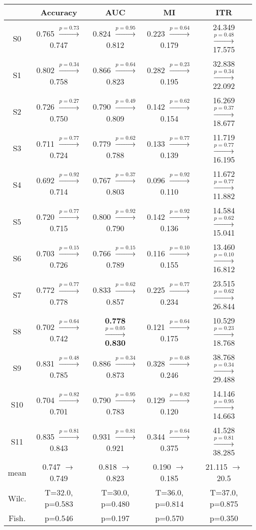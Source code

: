 \begin{tabular}{c c c c c}
\toprule
 & Accuracy & AUC & MI & ITR\\
\midrule
S0 &  0.765 $\xrightarrow{p=0.73}$  0.747 &  0.824 $\xrightarrow{p=0.95}$  0.812 &  0.223 $\xrightarrow{p=0.64}$  0.179 & 24.349 $\xrightarrow{p=0.48}$ 17.575\\
S1 &  0.802 $\xrightarrow{p=0.34}$  0.758 &  0.866 $\xrightarrow{p=0.64}$  0.823 &  0.282 $\xrightarrow{p=0.23}$  0.195 & 32.838 $\xrightarrow{p=0.34}$ 22.092\\
S2 &  0.726 $\xrightarrow{p=0.27}$  0.750 &  0.790 $\xrightarrow{p=0.49}$  0.809 &  0.142 $\xrightarrow{p=0.62}$  0.154 & 16.269 $\xrightarrow{p=0.37}$ 18.677\\
S3 &  0.711 $\xrightarrow{p=0.77}$  0.724 &  0.779 $\xrightarrow{p=0.62}$  0.788 &  0.133 $\xrightarrow{p=0.77}$  0.139 & 11.719 $\xrightarrow{p=0.77}$ 16.195\\
S4 &  0.692 $\xrightarrow{p=0.92}$  0.714 &  0.767 $\xrightarrow{p=0.37}$  0.803 &  0.096 $\xrightarrow{p=0.92}$  0.110 & 11.672 $\xrightarrow{p=0.77}$ 11.882\\
S5 &  0.720 $\xrightarrow{p=0.77}$  0.715 &  0.800 $\xrightarrow{p=0.92}$  0.790 &  0.142 $\xrightarrow{p=0.92}$  0.136 & 14.584 $\xrightarrow{p=0.62}$ 15.041\\
S6 &  0.703 $\xrightarrow{p=0.15}$  0.726 &  0.766 $\xrightarrow{p=0.15}$  0.789 &  0.116 $\xrightarrow{p=0.10}$  0.155 & 13.460 $\xrightarrow{p=0.10}$ 16.812\\
S7 &  0.772 $\xrightarrow{p=0.77}$  0.778 &  0.833 $\xrightarrow{p=0.62}$  0.857 &  0.225 $\xrightarrow{p=0.77}$  0.234 & 23.515 $\xrightarrow{p=0.62}$ 26.844\\
S8 &  0.702 $\xrightarrow{p=0.64}$  0.742 & \textbf{ 0.778 $\xrightarrow{p=0.05}$  0.830} &  0.121 $\xrightarrow{p=0.64}$  0.175 & 10.529 $\xrightarrow{p=0.23}$ 18.768\\
S9 &  0.831 $\xrightarrow{p=0.48}$  0.785 &  0.886 $\xrightarrow{p=0.34}$  0.873 &  0.328 $\xrightarrow{p=0.48}$  0.246 & 38.768 $\xrightarrow{p=0.34}$ 29.488\\
S10 &  0.704 $\xrightarrow{p=0.82}$  0.701 &  0.790 $\xrightarrow{p=0.95}$  0.783 &  0.129 $\xrightarrow{p=0.82}$  0.120 & 14.146 $\xrightarrow{p=0.95}$ 14.663\\
S11 &  0.835 $\xrightarrow{p=0.81}$  0.843 &  0.931 $\xrightarrow{p=0.81}$  0.921 &  0.344 $\xrightarrow{p=0.64}$  0.375 & 41.528 $\xrightarrow{p=0.81}$ 38.285\\
\midrule
mean & 0.747 $\rightarrow$ 0.749 & 0.818 $\rightarrow$ 0.823 & 0.190 $\rightarrow$ 0.185 & 21.115 $\rightarrow$ 20.5\\
Wilc. & T=32.0, p=0.583 & T=30.0, p=0.480 & T=36.0, p=0.814 & T=37.0, p=0.875\\
Fish. & p=0.546 & p=0.197 & p=0.570 & p=0.350\\
\bottomrule
\end{tabular}
